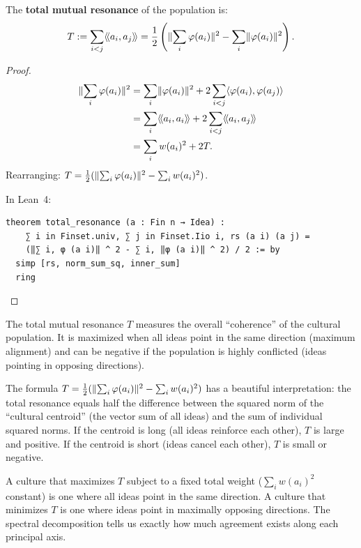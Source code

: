 \begin{theorem}
\label{thm:total-resonance}
The \textbf{total mutual resonance} of the population is:
\[
  T := \sum_{i < j} \langle\!\langle a_i, a_j \rangle\!\rangle = \frac{1}{2}\left(\lVert \sum_i
  \varphi(a_i) \rVert^2 - \sum_i \lVert \varphi(a_i) \rVert^2\right).
\]
\end{theorem}

\begin{proof}
\begin{align*}
  \lVert \sum_i \varphi(a_i) \rVert^2
  &= \sum_i \lVert \varphi(a_i) \rVert^2 + 2\sum_{i < j} \langle \varphi(a_i), \varphi(a_j) \rangle
  \\
  &= \sum_i \langle\!\langle a_i, a_i \rangle\!\rangle + 2\sum_{i < j} \langle\!\langle a_i, a_j \rangle\!\rangle \\
  &= \sum_i w(a_i)^2 + 2T.
\end{align*}
Rearranging: $T = \frac{1}{2}(\lVert \sum_i \varphi(a_i) \rVert^2 - \sum_i w(a_i)^2)$.

In Lean~4:
\begin{lstlisting}
theorem total_resonance (a : Fin n → Idea) :
    ∑ i in Finset.univ, ∑ j in Finset.Iio i, rs (a i) (a j) =
    (‖∑ i, φ (a i)‖ ^ 2 - ∑ i, ‖φ (a i)‖ ^ 2) / 2 := by
  simp [rs, norm_sum_sq, inner_sum]
  ring
\end{lstlisting}
\end{proof}

\begin{interpretation}
\label{interp:total-resonance}
The total mutual resonance $T$ measures the overall ``coherence'' of the
cultural population. It is maximized when all ideas point in the same direction
(maximum alignment) and can be negative if the population is highly conflicted
(ideas pointing in opposing directions).

The formula $T = \frac{1}{2}(\lVert \sum_i \varphi(a_i) \rVert^2 - \sum_i w(a_i)^2)$
has a beautiful interpretation: the total resonance equals half the difference
between the squared norm of the ``cultural centroid'' (the vector sum of all
ideas) and the sum of individual squared norms. If the centroid is long
(all ideas reinforce each other), $T$ is large and positive. If the centroid
is short (ideas cancel each other), $T$ is small or negative.

A culture that maximizes $T$ subject to a fixed total weight ($\sum_i w(a_i)^2$
constant) is one where all ideas point in the same direction. A culture that
minimizes $T$ is one where ideas point in maximally opposing directions. The
spectral decomposition tells us exactly how much agreement exists along each
principal axis.
\end{interpretation}


